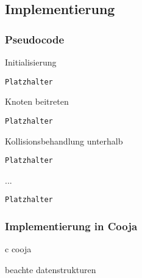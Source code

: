 
\subsection{Implementierung}
\label{subsec:di_implementierung}

\subsubsection{Pseudocode}
\label{subsubsec:di_pseudocode}

Initialisierung
\begin{lstlisting}[frame=single]
Platzhalter
\end{lstlisting}

Knoten beitreten
\begin{lstlisting}[frame=single]
Platzhalter
\end{lstlisting}

Kollisionsbehandlung unterhalb
\begin{lstlisting}[frame=single]
Platzhalter
\end{lstlisting}

...
\begin{lstlisting}[frame=single]
Platzhalter
\end{lstlisting}


\subsubsection{Implementierung in Cooja}
\label{subsubsec:di_impl_cooja}
c cooja

beachte datenstrukturen
